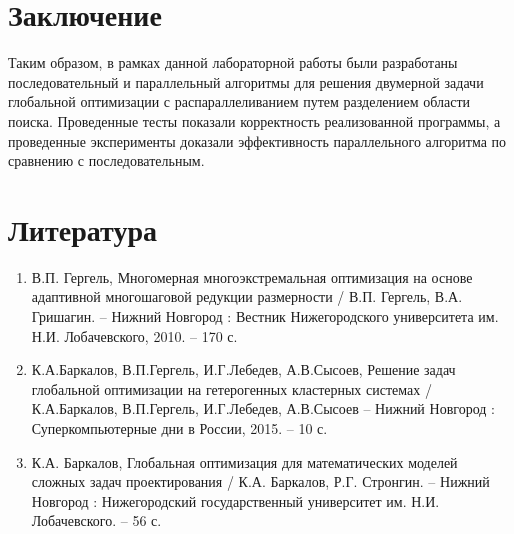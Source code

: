 \documentclass{report}
\begin{document}
\newpage

\section*{Заключение}
Таким образом, в рамках данной лабораторной работы были разработаны последовательный и параллельный алгоритмы для решения двумерной задачи глобальной оптимизации с распараллеливанием путем разделением области поиска. Проведенные тесты показали корректность реализованной программы, а проведенные эксперименты доказали эффективность параллельного алгоритма по сравнению с последовательным.
\newpage


\section*{Литература}
\begin{enumerate}
\item В.П. Гергель,  Многомерная многоэкстремальная оптимизация на основе адаптивной многошаговой редукции размерности /  В.П. Гергель,  В.А. Гришагин. – Нижний Новгород : Вестник Нижегородского университета им. Н.И. Лобачевского, 2010. – 170 с.
\item К.А.Баркалов, В.П.Гергель, И.Г.Лебедев, А.В.Сысоев, Решение задач глобальной оптимизации на гетерогенных кластерных системах /  К.А.Баркалов, В.П.Гергель, И.Г.Лебедев, А.В.Сысоев – Нижний Новгород : Суперкомпьютерные дни в России, 2015. – 10 с.
\item К.А. Баркалов, Глобальная оптимизация для математических моделей сложных задач проектирования /  К.А. Баркалов,  Р.Г. Стронгин. – Нижний Новгород : Нижегородский государственный университет им. Н.И. Лобачевского. – 56 с.
\end{enumerate} 
\newpage
\end{document}
